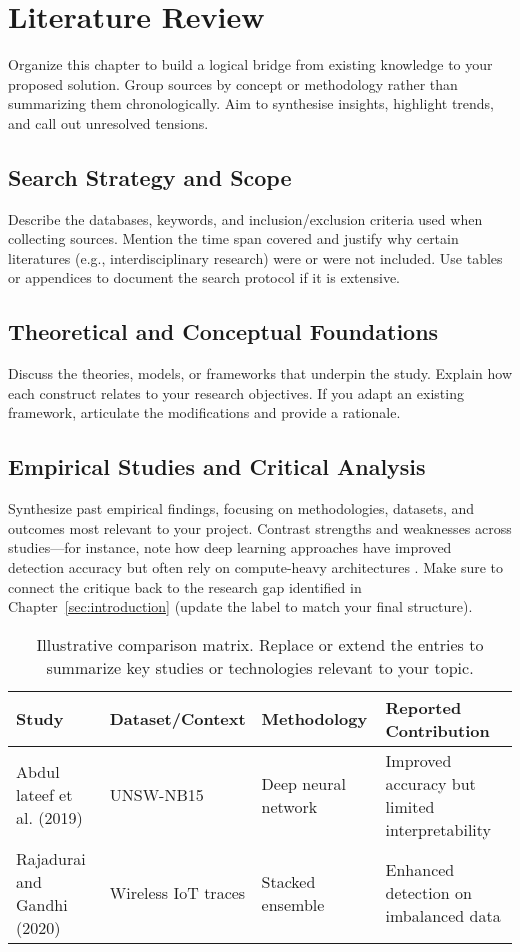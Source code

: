 \section{Literature Review}
\label{sec:literature}

\noindent Organize this chapter to build a logical bridge from existing knowledge
to your proposed solution. Group sources by concept or methodology rather than
summarizing them chronologically. Aim to synthesise insights, highlight trends,
and call out unresolved tensions.

\subsection{Search Strategy and Scope}
Describe the databases, keywords, and inclusion/exclusion criteria used when
collecting sources. Mention the time span covered and justify why certain
literatures (e.g., interdisciplinary research) were or were not included. Use
tables or appendices to document the search protocol if it is extensive.

\subsection{Theoretical and Conceptual Foundations}
Discuss the theories, models, or frameworks that underpin the study. Explain
how each construct relates to your research objectives. If you adapt an
existing framework, articulate the modifications and provide a rationale.

\subsection{Empirical Studies and Critical Analysis}
Synthesize past empirical findings, focusing on methodologies, datasets, and
outcomes most relevant to your project. Contrast strengths and weaknesses
across studies—for instance, note how deep learning approaches have improved
detection accuracy but often rely on compute-heavy architectures
\citep{Rajadurai2020}. Make sure to connect the critique back to the research
gap identified in Chapter~\ref{sec:introduction} (update the label to match
your final structure).

\begin{table}[H]
    \centering
    \caption{Illustrative comparison matrix. Replace or extend the entries to
        summarize key studies or technologies relevant to your topic.}\label{tab:related-work}
    \begin{tabular}{p{3.5cm}p{3cm}p{3cm}p{3.5cm}}
        \hline
        Study                       & Dataset/Context     & Methodology         & Reported Contribution                          \\
        \hline
        Abdul lateef et al. (2019)  & UNSW-NB15           & Deep neural network & Improved accuracy but limited interpretability \\
        Rajadurai and Gandhi (2020) & Wireless IoT traces & Stacked ensemble    & Enhanced detection on imbalanced data          \\
        \hline
    \end{tabular}
\end{table}

